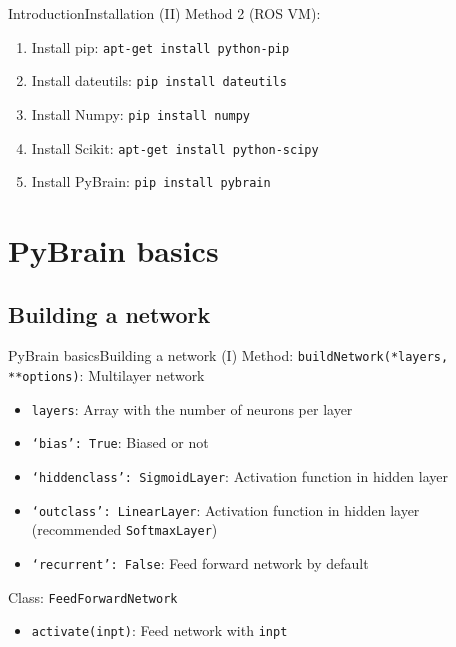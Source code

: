 \documentclass[10pt,compress]{beamer} %
\begin{document}
\begin{frame}{Introduction}{Installation (II)}
	Method 2 (ROS VM):
	\begin{enumerate}
		\item Install pip: \texttt{apt-get install python-pip}
		\item Install dateutils: \texttt{pip install dateutils}
		\item Install Numpy: \texttt{pip install numpy}
		\item Install Scikit: \texttt{apt-get install python-scipy}
		\item Install PyBrain: \texttt{pip install pybrain}
	\end{enumerate}

\end{frame}

\section{PyBrain basics}
\subsection{Building a network}
\begin{frame}{PyBrain basics}{Building a network (I)}
	Method: \texttt{buildNetwork(*layers, **options)}: Multilayer network
	\begin{itemize}
	\item \texttt{layers}: Array with the number of neurons per layer
	\item \texttt{`bias': True}: Biased or not
	\item \texttt{`hiddenclass': SigmoidLayer}: Activation function in hidden layer
	\item \texttt{`outclass': LinearLayer}: Activation function in hidden layer (recommended \texttt{SoftmaxLayer})
	\item \texttt{`recurrent': False}: Feed forward network by default
	\end{itemize}
	Class: \texttt{FeedForwardNetwork}
	\begin{itemize}
	\item \texttt{activate(inpt)}: Feed network with \texttt{inpt}
	\end{itemize}
\end{frame}
\end{document}
